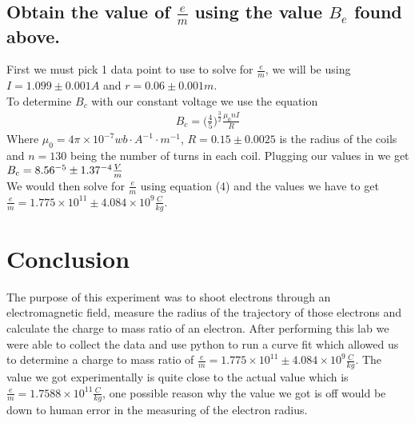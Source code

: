 \documentclass{article}
\begin{document}
\subsection*{Obtain the value of $\frac{e}{m}$ using the value $B_e$ found above.}
First we must pick 1 data point to use to solve for $\frac{e}{m}$, we will be
using $I = 1.099 \pm 0.001 A$ and $r = 0.06 \pm 0.001 m$.\\
To determine $B_c$ with our constant voltage we use the equation
\begin{align*}
    B_c = \bigg(\frac{4}{5}\bigg)^{\frac{3}{2}}\frac{\mu_0nI}{R}
\end{align*}
Where $\mu_0 = 4\pi\times10^{-7}wb\cdot A^{-1}\cdot m^{-1}$, $R = 0.15 \pm 0.0025$
is the radius of the coils and $n = 130$ being the number of turns in each coil.
Plugging our values in we get $B_c = 8.56\time10^{-5} \pm 1.37\time10^{-4}\frac{V}{m}$\\
We would then solve for $\frac{e}{m}$ using equation (4) and the values we have
to get $\frac{e}{m} = 1.775\times 10^{11} \pm 4.084\times10^{9}\frac{C}{kg}$.
\section{Conclusion}
The purpose of this experiment was to shoot electrons through an electromagnetic
field, measure the radius of the trajectory of those electrons and calculate the
charge to mass ratio of an electron. After performing this lab we were able to
collect the data and use python to run a curve fit which allowed us to determine
a charge to mass ratio of $\frac{e}{m} = 1.775\times 10^{11} \pm 4.084\times10^{9}\frac{C}{kg}$.
The value we got experimentally is quite close to the actual value which is
$\frac{e}{m} = 1.7588\times10^{11}\frac{C}{kg}$, one possible reason why the value
we got is off would be down to human error in the measuring of the electron radius.
\end{document}
